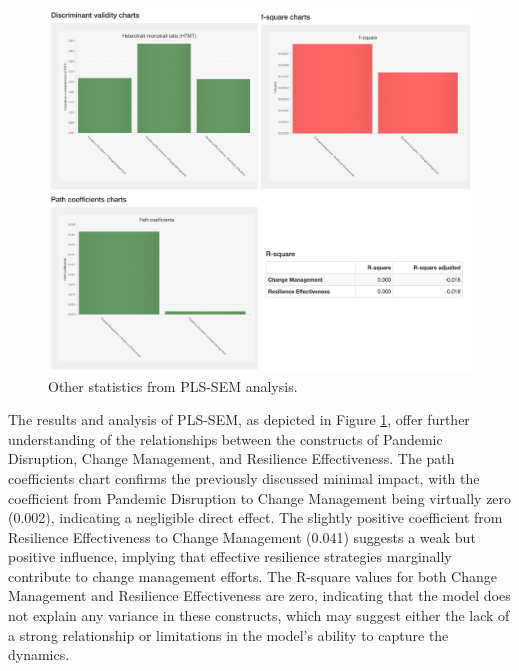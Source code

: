 \begin{figure}[ht]
  \centering
  \includegraphics[width=1\textwidth]{figure/other_results.png}
  \caption{Other statistics from PLS-SEM analysis.}
  \label{fig:other_results}
\end{figure}

The results and analysis of PLS-SEM, as depicted in Figure \ref{fig:other_results}, offer further understanding of the relationships between the constructs of Pandemic Disruption, Change Management, and Resilience Effectiveness. The path coefficients chart confirms the previously discussed minimal impact, with the coefficient from Pandemic Disruption to Change Management being virtually zero (0.002), indicating a negligible direct effect. The slightly positive coefficient from Resilience Effectiveness to Change Management (0.041) suggests a weak but positive influence, implying that effective resilience strategies marginally contribute to change management efforts. The R-square values for both Change Management and Resilience Effectiveness are zero, indicating that the model does not explain any variance in these constructs, which may suggest either the lack of a strong relationship or limitations in the model's ability to capture the dynamics. 

